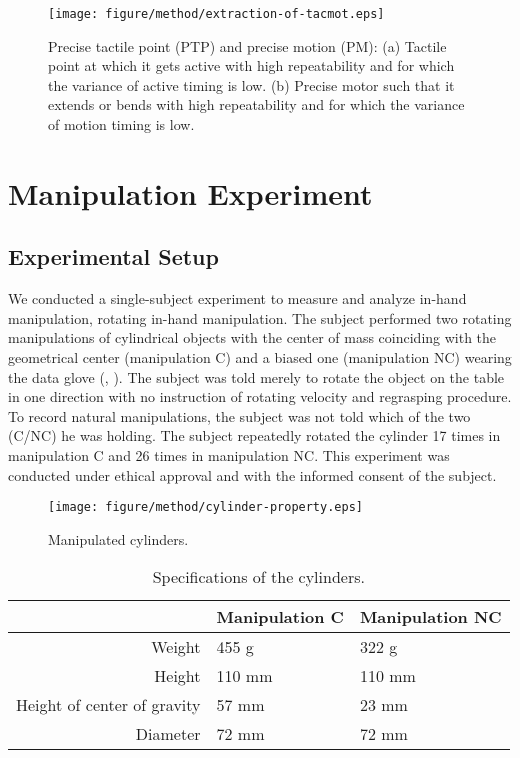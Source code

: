 \documentclass[letterpaper, 10 pt, conference]{IEEEtran}  %
\begin{document}
\begin{figure}[t!]
 \centering
  \texttt{[image: figure/method/extraction-of-tacmot.eps]}
  \caption{Precise tactile point (PTP) and precise motion (PM): (a) Tactile point at which it gets active with high repeatability and for which the variance of active timing is low. (b) Precise motor such that it extends or bends with high repeatability and for which the variance of motion timing is low.}
 \label{fig:way-to-extract}
\end{figure}


\section{Manipulation Experiment}
\subsection{Experimental Setup}
We conducted a single-subject experiment to measure and analyze in-hand manipulation, rotating in-hand manipulation. The subject performed two rotating manipulations of cylindrical objects with the center of mass coinciding with the geometrical center (manipulation C) and a biased one (manipulation NC) wearing the data glove (, ). The subject was told merely to rotate the object on the table in one direction with no instruction of rotating velocity and regrasping procedure. To record natural manipulations, the subject was not told which of the two (C/NC) he was holding. The subject repeatedly rotated the cylinder 17 times in manipulation C and 26 times in manipulation NC. This experiment was conducted under ethical approval and with the informed consent of the subject.

\begin{figure}[t!]
 \centering
 \texttt{[image: figure/method/cylinder-property.eps]}
 \caption{Manipulated cylinders.} 
 \label{fig:cylinder}
\end{figure}

\begin{table}[t!]
 \centering
 \caption{Specifications of the cylinders.}
      \begin{tabular}{|r||l|l|} \hline
               & Manipulation C & Manipulation NC \\ \hline \hline
              Weight & 455 g & 322 g \\ \hline
              Height & 110 mm & 110 mm \\ \hline
              Height of center of gravity & 57 mm & 23 mm \\ \hline
              Diameter & 72 mm & 72 mm \\ \hline
            \end{tabular}
    \label{tab:specification-of-robot}
\end{table}
\end{document}
